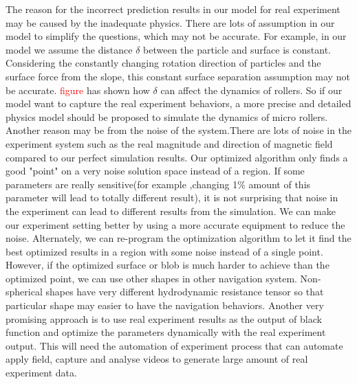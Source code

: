  The reason for the incorrect prediction results in our model for real experiment may be caused by the inadequate physics. There are lots of assumption in our model to simplify the questions, which may not be accurate. For example, in our model we assume the distance $\delta$ between the particle and surface is constant. Considering the constantly changing rotation direction of particles and the surface force from the slope, this constant surface separation assumption may not be accurate. \textcolor{red}{figure} has shown how $\delta$ can affect the dynamics of rollers. So if our model want to capture the real experiment behaviors, a more precise and detailed physics model should be proposed to  simulate the dynamics of micro rollers. Another reason may be from the noise of the system.There are lots of noise in the experiment system  such as the real magnitude and direction of magnetic field compared to our perfect simulation results. Our optimized algorithm only finds a good  "point" on a very noise solution space instead of a region. If some parameters are really sensitive(for example ,changing 1$\%$ amount of this parameter will lead to totally different result), it is not surprising that noise in the experiment can lead to different results from the simulation. We can make our experiment setting better by using a more accurate equipment to reduce the noise. Alternately, we can re-program the optimization algorithm to let it find the best optimized results in a region with some noise instead of a single point. However, if the optimized  surface or blob is much harder to achieve than the optimized point, we can use other shapes in other navigation system. Non-spherical shapes have very different hydrodynamic resistance tensor\cite{brooks2018shape} so that particular shape may easier to have the navigation behaviors. Another very promising approach is to use real experiment results as the output of black function and optimize the parameters dynamically with the real experiment output. This will need the automation of experiment process that can automate apply field, capture and analyse videos to generate large amount of real experiment data.\cite{oulmas20183d}

